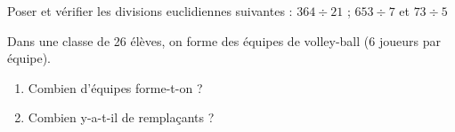\begin{myexs}
	Poser et vérifier les divisions euclidiennes suivantes : $364 \div 21$ ; $653 \div 7$ et $73 \div 5$
	
	\vspace*{4cm} 
\end{myexs}

\begin{mypb}
	Dans une classe de 26 élèves, on forme des équipes de volley-ball (6 joueurs par équipe).
	
	\begin{enumerate}
		\item Combien d’équipes forme-t-on ?
		\item Combien y-a-t-il de remplaçants ?	
	\end{enumerate}

\vspace*{4cm} 	
\end{mypb}